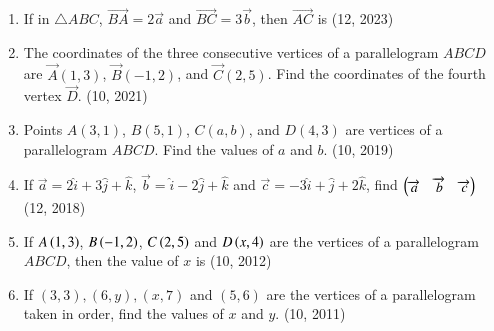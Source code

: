 \begin{enumerate}[label=\thesubsection.\arabic*, ref=\thesubsection.\theenumi]
    \item If in $\triangle ABC$, $\overrightarrow{BA} = 2\overrightarrow{a}$ and $\overrightarrow{BC} = 3\overrightarrow{b}$, then $\overrightarrow{AC}$ is
    \hfill (12, 2023)
	\item The coordinates of the three consecutive vertices of a parallelogram $ABCD$ are $\vec{A}(1, 3)$, $\vec{B}(-1, 2)$, and $\vec{C}(2, 5)$. Find the coordinates of the fourth vertex $\vec{D}$. \hfill (10, 2021)
\item Points $A(3, 1)$, $B(5, 1)$, $C(a, b)$, and $D(4, 3)$ are vertices of a parallelogram $ABCD$. Find the values of $a$ and $b$. \hfill (10, 2019)
\item If $\overrightarrow{a}=2\hat{i}+3\hat{j}+\hat{k}$, $\overrightarrow{b}=\hat{i}-2\hat{j}+\hat{k}$ and $\overrightarrow{c}=-3\hat{i}+\hat{j}+2\hat{k}$, find $\begin{pmatrix}\overrightarrow{a}&\overrightarrow{b}&\overrightarrow{c} \end{pmatrix}$
\hfill (12, 2018) 
\item If $A\left(1,3\right)$, $B\left(-1,2\right)$, $C\left(2,5\right)$ and $D\left(x,4\right)$ are the vertices of a parallelogram $ABCD$, then the value of $x$ is
\hfill (10, 2012)
    \item If $(3,3),(6,y),(x,7)$ and $(5,6)$ are the vertices of a parallelogram taken in order, find the values of $x$ and $y$.
\hfill (10, 2011)
	
\end{enumerate}
